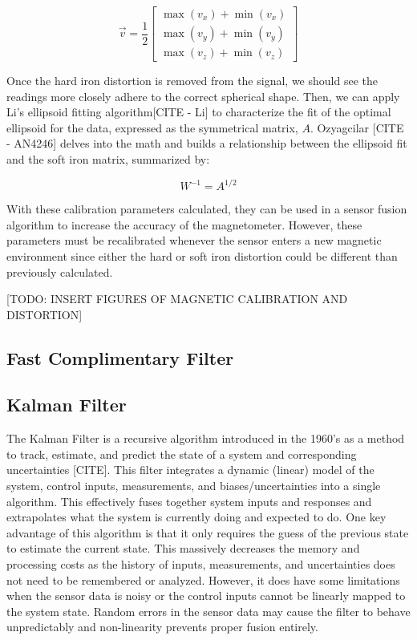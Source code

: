 \begin{equation*}
    \vec{v}=\frac{1}{2}
    \begin{bmatrix}
        \max(v_x)+\min(v_x) \\
        \max(v_y)+\min(v_y) \\
        \max(v_z)+\min(v_z)
    \end{bmatrix}
\end{equation*}

Once the hard iron distortion is removed from the signal, we should see the readings more closely adhere to the correct spherical shape. 
Then, we can apply Li’s ellipsoid fitting algorithm[CITE - Li] to characterize the fit of the optimal ellipsoid for the data, expressed as the symmetrical matrix, $A$. 
Ozyagcilar [CITE - AN4246] delves into the math and builds a relationship between the ellipsoid fit and the soft iron matrix, summarized by:

\begin{equation*}
    W^{-1}=A^{1/2}
\end{equation*}

With these calibration parameters calculated, they can be used in a sensor fusion algorithm to increase the accuracy of the magnetometer. 
However, these parameters must be recalibrated whenever the sensor enters a new magnetic environment since either the hard or soft iron distortion could be different than previously calculated.

[TODO: INSERT FIGURES OF MAGNETIC CALIBRATION AND DISTORTION]

\subsection{Fast Complimentary Filter} \label{ssec:complimentary_filter}

\subsection{Kalman Filter} \label{ssec:kalman_filter}
The Kalman Filter is a recursive algorithm introduced in the 1960's as a method to track, estimate, and predict the state of a system and corresponding uncertainties [CITE].
This filter integrates a dynamic (linear) model of the system, control inputs, measurements, and biases/uncertainties into a single algorithm.
This effectively fuses together system inputs and responses and extrapolates what the system is currently doing and expected to do.
One key advantage of this algorithm is that it only requires the guess of the previous state to estimate the current state. 
This massively decreases the memory and processing costs as the history of inputs, measurements, and uncertainties does not need to be remembered or analyzed.
However, it does have some limitations when the sensor data is noisy or the control inputs cannot be linearly mapped to the system state.
Random errors in the sensor data may cause the filter to behave unpredictably and non-linearity prevents proper fusion entirely.

